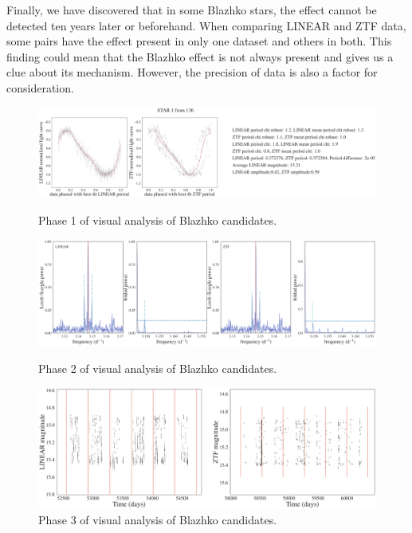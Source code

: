 Finally, we have discovered that in some Blazhko stars, the effect cannot be detected ten years later or beforehand. When comparing LINEAR and ZTF data, some pairs have the effect present in only one dataset and others in both. This finding could mean that the Blazhko effect is not always present and gives us a clue about its mechanism. However, the precision of data is also a factor for consideration. 

\begin{figure}[ht]
  \centering
  \includegraphics[width=17cm]{LCplot_7048826.png}
       \caption{Phase 1 of visual analysis of Blazhko candidates.}
       \label{fig:phase1}
  \includegraphics[width=17cm]{periodogram7048826.png}
    \caption{Phase 2 of visual analysis of Blazhko candidates.}
    \label{fig:phase2}

    \centering
       \includegraphics[width=17cm]{season_plot7048826.png}
         \caption{Phase 3 of visual analysis of Blazhko candidates.}
         \label{fig:phase3}
\end{figure}
